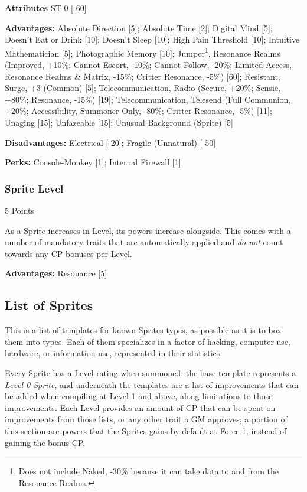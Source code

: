 \begin{multicols*}{3}
\textbf{Attributes}
ST 0 [-60]

\textbf{Advantages:}
Absolute Direction [5]; Absolute Time [2]; Digital Mind [5]; Doesn't Eat or Drink [10]; Doesn't Sleep [10]; High Pain Threshold [10]; Intuitive Mathematician [5]; Photographic Memory [10]; Jumper\footnote{Does not include Naked, -30\% because it can take data to and from the Resonance Realms.}, Resonance Realms (Improved, +10\%; Cannot Escort, -10\%; Cannot Follow, -20\%; Limited Access, Resonance Realms \& Matrix, -15\%; Critter Resonance, -5\%) [60];  Resistant, Surge, +3 (Common) [5]; Telecommunication, Radio (Secure, +20\%; Sensie, +80\%; Resonance, -15\%) [19]; Telecommunication, Telesend (Full Communion, +20\%; Accessibility, Summoner Only, -80\%; Critter Resonance, -5\%) [11]; Unaging [15]; Unfazeable [15]; Unusual Background (Sprite) [5]

\textbf{Disadvantages:}
Electrical [-20]; Fragile (Unnatural) [-50]

\textbf{Perks:}
Console-Monkey [1]; Internal Firewall [1]

\subsubsection{Sprite Level}\label{sprite_level}
\begin{flushright}
	5 Points
\end{flushright}

As a Sprite increases in Level, its powers increase alongside. This comes with a number of mandatory traits that are automatically applied and \textit{do not} count towards any CP bonuses per Level.

\textbf{Advantages:}
Resonance [5]

\subsection{List of Sprites}

This is a list of templates for known Sprites types, as possible as it is to box them into types. Each of them specializes in a factor of hacking, computer use, hardware, or information use, represented in their statistics.

Every Sprite has a Level rating when summoned. the base template represents a \textit{Level 0 Sprite}, and underneath the templates are a list of improvements that can be added when compiling at Level 1 and above, along limitations to those improvements. Each Level provides an amount of CP that can be spent on improvements from those lists, or any other trait a GM approves; a portion of this section are powers that the Sprites gains by default at Force 1, instead of gaining the bonus CP. 


\end{multicols*}
